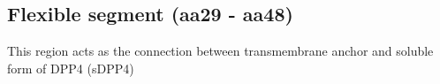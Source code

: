 \subsection{Flexible segment (aa29 - aa48)}

This region acts as the connection between transmembrane anchor and soluble form of DPP4 (sDPP4) 
